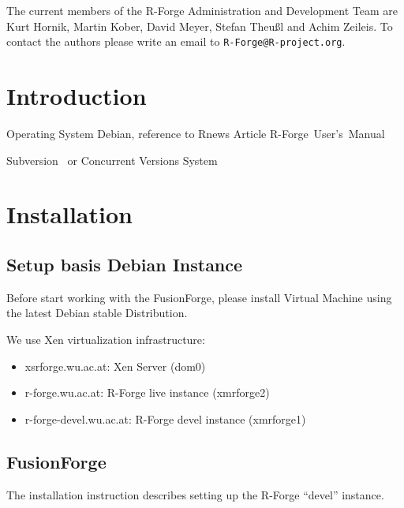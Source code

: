 \documentclass[a4paper]{article}
\newcommand{\RFORGE}{R-Forge Administration and Development Team}
\let\email=\texttt
\begin{document}
\vspace{0.5cm}
The current members of the \RFORGE{} are Kurt Hornik, Martin Kober,
David Meyer, Stefan Theu\ss{}l and Achim Zeileis. To contact the
authors please write an email to \email{R-Forge@R-project.org}.

\newpage

\pagestyle{plain}
\tableofcontents

\clearpage
\pagestyle{headings}
\setcounter{page}{1}

\section{Introduction}

Operating System Debian, reference to Rnews Article
R-Forge~User's~Manual

Subversion~\citep[SVN,
see][]{forge:Pilato+Collins-Sussman+Fitzpatrick:2004} or Concurrent
Versions System~\citep[CVS, see][]{forge:Cederqvist:2006}


\newpage
\section{Installation}
\label{sec:installation}

\subsection{Setup basis Debian Instance}

Before start working with the FusionForge, please install Virtual Machine using the latest
Debian stable Distribution. 

\vspace{0.5cm}
We use Xen virtualization infrastructure:

\begin{itemize}
	\item xsrforge.wu.ac.at: Xen Server (dom0)
	\item r-forge.wu.ac.at: R-Forge live instance (xmrforge2)
	\item r-forge-devel.wu.ac.at: R-Forge devel instance (xmrforge1)
\end{itemize}

\subsection{FusionForge}

The installation instruction describes setting up the R-Forge ``devel'' instance.
\end{document}
